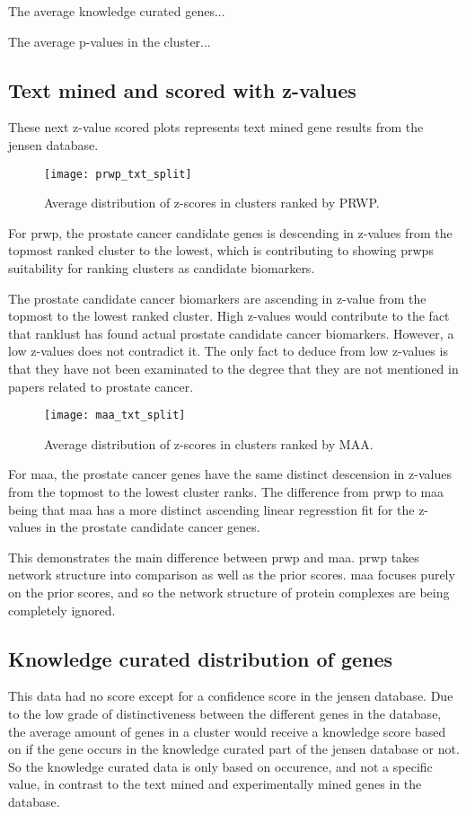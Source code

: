 The average knowledge curated genes...

The average p-values in the cluster...

\subsection{Text mined and scored with z-values}
These next z-value scored plots represents text mined gene results from the
\gls{jensen} database.

\begin{sidewaysfigure}[H]
    \label{fig:txt-iref-prwp}
    \texttt{[image: prwp\_txt\_split]}
    \caption{Average distribution of z-scores in clusters ranked by PRWP.}
\end{sidewaysfigure}
For \gls{prwp}, the prostate cancer candidate genes is descending in z-values
from the topmost ranked cluster to the lowest, which is contributing to
showing \gls{prwp}s suitability for ranking clusters as candidate biomarkers. 

The prostate candidate cancer biomarkers are ascending in z-value from the
topmost to the lowest ranked cluster. High z-values would contribute to the fact
that ranklust has found actual prostate candidate cancer biomarkers. However,
a low z-values does not contradict it. The only fact to deduce from low z-values
is that they have not been examinated to the degree that they are not mentioned
in papers related to prostate cancer.

\begin{sidewaysfigure}[H]
    \label{fig:txt-iref-maa}
    \texttt{[image: maa\_txt\_split]}
    \caption{Average distribution of z-scores in clusters ranked by MAA.}
\end{sidewaysfigure}
For \gls{maa}, the prostate cancer genes have the same distinct descension in
z-values from the topmost to the lowest cluster ranks. The difference from
\gls{prwp} to \gls{maa} being that \gls{maa} has a more distinct ascending
linear regresstion fit for the z-values in the prostate candidate cancer genes.

This demonstrates the main difference between \gls{prwp} and \gls{maa}.
\gls{prwp} takes network structure into comparison as well as the prior scores.
\gls{maa} focuses purely on the prior scores, and so the network structure of
protein complexes are being completely ignored.

\subsection{Knowledge curated distribution of genes}
This data had no score except for a confidence score in the \gls{jensen}
database. Due to the low grade of distinctiveness between the different genes in
the database, the average amount of genes in a cluster would receive a knowledge
score based on if the gene occurs in the knowledge curated part of the
\gls{jensen} database or not. So the knowledge curated data is only based on
occurence, and not a specific value, in contrast to the text mined and
experimentally mined genes in the database.

